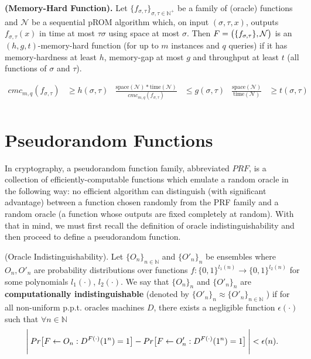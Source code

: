 \begin{definition}{\textbf{(Memory-Hard Function).}} \textnormal{\cite{cryptoeprint:2016:875}}
  Let $\{ f_{\sigma, \tau} \}_{\sigma, \tau \in \mathbb{N}^{+}}$ be a family of (oracle) functions and $\mathcal{N}$ be a sequential pROM algorithm which, on input $(\sigma, \tau, x)$, outputs $f_{\sigma, \tau}(x)$ in time at most $\tau \sigma$ using space at most $\sigma$. Then $F=\big{(} \{ f_{\sigma,\tau} \}, \mathcal{N} \big{)}$
  is an $(h,g,t)$-memory-hard function (for up to $m$ instances and $q$ queries) if it has memory-hardness at least $h$, memory-gap at most $g$ and throughput at least $t$ (all functions of $\sigma$ and $\tau$).

\begin{align*}
cmc_{m,q}(f_{\sigma, \tau})&\geq h(\sigma, \tau)           &  \frac{\mbox{space}(\mathcal{N})*\mbox{time}(\mathcal{N})}{cmc_{m,q}(f_{\sigma, \tau})} &\leq g(\sigma, \tau)             &  \frac{\mbox{space}(\mathcal{N})}{\mbox{time}(\mathcal{N})} &\geq t(\sigma, \tau)\\
\end{align*}
%
\end{definition}
%
\section{Pseudorandom Functions}
In cryptography, a pseudorandom function family, abbreviated $PRF$, is a collection of efficiently-computable functions which emulate a random oracle in the following way: no efficient algorithm can distinguish (with significant advantage) between a function chosen randomly from the PRF family and a random oracle (a function whose outputs are fixed completely at random). With that in mind,
we must first recall the definition of oracle indistinguishability and then proceed to define a pseudorandom function.

\begin{definition}{(Oracle Indistinguishability).} \textnormal{\cite{ACI}}
  Let $\{ O_n \}_{n \in \mathbb{N}}$ and $\{ O'_{n} \}_{n}$ be ensembles where $O_n, O'_n$ are probability
  distributions over functions $f: \{ 0,1 \}^{l_1(n)} \rightarrow \{ 0,1 \}^{l_2(n)}$ for some polynomials $l_1(\cdot)$, $l_2(\cdot)$. We say that $\{ O_{n} \}_{n}$ and $\{ O'_{n} \}_{n}$ are \textbf{computationally indistinguishable} (denoted by $\{ O'_{n} \}_{n} \approx \{ O'_n \}_{n \in \mathbb{N}}$
  ) if for all non-uniform p.p.t. oracles machines $D$, there exists a negligible function $\epsilon(\cdot)$ such that $\forall n \in \mathbb{N}$
  \begin{equation}{\label{oracle}}
    \Bigg{\lvert} \: Pr \big{[} F \leftarrow O_n : D^{F(\cdot)}(1^n)=1 \big{]} - Pr \big{[} F \leftarrow O'_n : D^{F(\cdot)}(1^n)=1 \big{]} \: \Bigg{\rvert} < \epsilon(n).
  \end{equation}
\end{definition}

